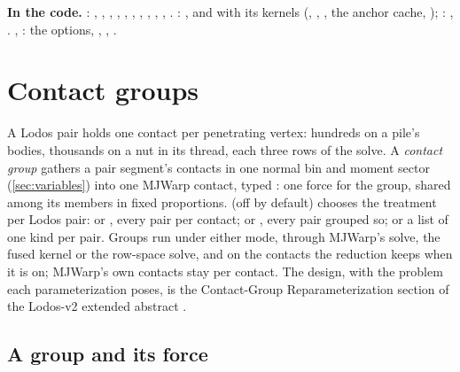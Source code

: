 \begin{codebox}
\textbf{In the code.} : , , , , , , , , , , . : , and  with its kernels (, , , the anchor cache, ); : , . , : the  options, , , .
\end{codebox}

\section{Contact groups}\label{sec:groups}

A Lodos pair holds one contact per penetrating vertex: hundreds on a pile's bodies, thousands on a nut in its thread, each three rows of the solve. A \emph{contact group} gathers a pair segment's contacts in one normal bin and moment sector (\cref{sec:variables}) into one MJWarp contact, typed : one force for the group, shared among its members in fixed proportions.  (off by default) chooses the treatment per Lodos pair:  or , every pair per contact;  or , every pair grouped so; or a list of one kind per pair. Groups run under either mode, through MJWarp's solve, the fused kernel or the row-space solve, and on the contacts the reduction keeps when it is on; MJWarp's own contacts stay per contact. The design, with the problem each parameterization poses, is the Contact-Group Reparameterization section of the Lodos-v2 extended abstract \cite{lodosv2}.

\subsection{A group and its force}\label{sec:groupforce}

